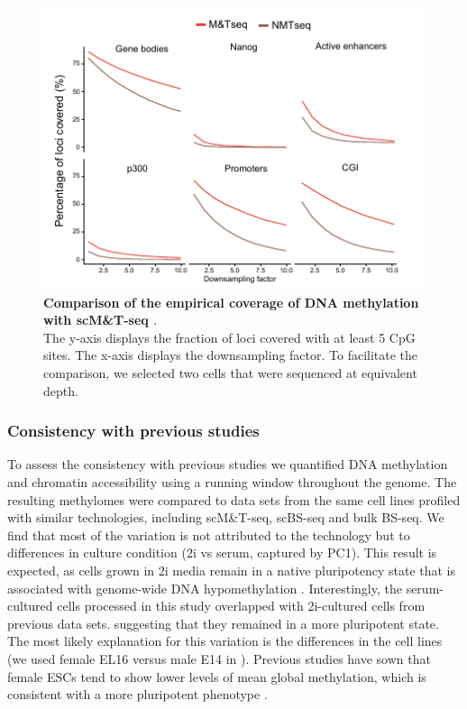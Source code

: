 \begin{figure}[H]
	\centering
	\includegraphics[width=0.8\linewidth]{scNMT_coverage2}
	\caption[]{\textbf{Comparison of the empirical coverage of DNA methylation with scM\&T-seq \cite{Angermueller2016}}.\\
	The y-axis displays the fraction of loci covered with at least 5 CpG sites. The x-axis displays the downsampling factor. To facilitate the comparison, we selected two cells that were sequenced at equivalent depth.}
	\label{fig:scnmt_coverage2}
\end{figure}

\subsubsection{Consistency with previous studies}

To assess the consistency with previous studies we quantified DNA methylation and chromatin accessibility using a running window throughout the genome. The resulting methylomes were compared to data sets from the same cell lines profiled with similar technologies, including scM\&T-seq\cite{Angermueller2016}, scBS-seq\cite{Smallwood2014} and bulk BS-seq\cite{Ficz2013}. We find that most of the variation is not attributed to the technology but to differences in culture condition (2i vs serum, captured by PC1). This result is expected, as cells grown in 2i media remain in a native pluripotency state that is associated with genome-wide DNA hypomethylation \cite{Ficz2013}. Interestingly, the serum-cultured cells processed in this study overlapped with 2i-cultured cells from previous data sets. suggesting that they remained in a more pluripotent state. The most likely explanation for this variation is the differences in the cell lines (we used female EL16 versus male E14 in \cite{Angermueller2016,Smallwood2014,Ficz2013}). Previous studies have sown that female ESCs tend to show lower levels of mean global methylation, which is consistent with a more pluripotent phenotype \cite{Zvetkova2005}.\\

